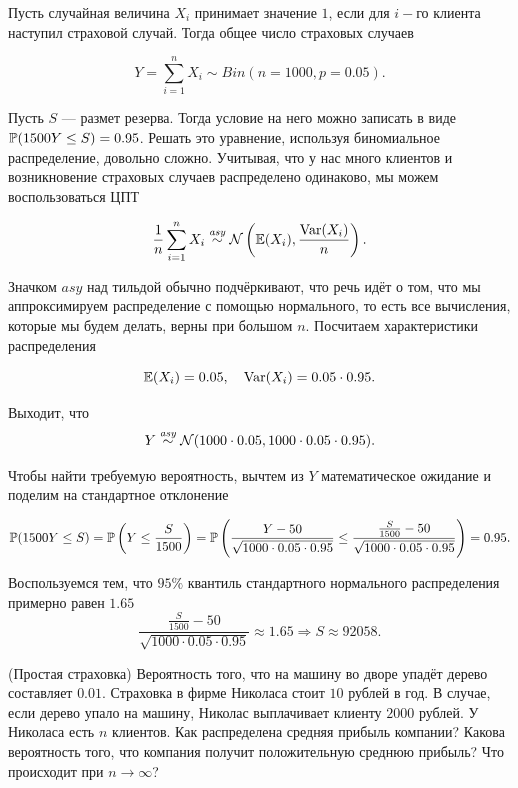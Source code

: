 \documentclass[12pt, a4paper, oneside]{article}
\begin{document}
\begin{sol}
Пусть случайная величина $X_i$ принимает значение $1$, если для $i-$го клиента наступил страховой случай. Тогда общее число страховых случаев 

\[
Y = \sum_{i=1}^n X_i \sim Bin(n=1000, p=0.05).
\]

Пусть $S$ --- размет резерва. Тогда условие на него можно записать в виде $\mathbb{P}(1500 Y \leq S) = 0.95$. Решать это уравнение, используя биномиальное распределение, довольно сложно. Учитывая, что у нас много клиентов и возникновение страховых случаев распределено одинаково, мы можем воспользоваться ЦПТ

\[
\frac{1}{n} \sum_{i=1}^n X_i \overset{\text{\textit{asy}}}{\sim} \mathcal{N} \left(\mathbb{E}(X_i), \frac{\operatorname{Var}(X_i)}{n} \right).
\] 

Значком $asy$ над тильдой обычно подчёркивают, что речь идёт о том, что мы аппроксимируем распределение с помощью нормального, то есть все вычисления, которые мы будем делать, верны при большом $n$. Посчитаем характеристики распределения 

\[
\mathbb{E}(X_i) = 0.05, \quad \operatorname{Var}(X_i) = 0.05 \cdot 0.95.
\]

Выходит, что \[Y \overset{\text{\textit{asy}}}{\sim} \mathcal{N}(1000 \cdot 0.05, 1000 \cdot 0.05 \cdot 0.95).\] 

Чтобы найти требуемую вероятность, вычтем из $Y$ математическое ожидание и поделим на стандартное отклонение

\[
\mathbb{P}(1500 Y \leq S) = \mathbb{P}\left(Y \leq \frac{S}{1500} \right) = \mathbb{P}\left(\frac{Y - 50}{\sqrt{1000 \cdot 0.05 \cdot 0.95}} \leq \frac{\frac{S}{1500}-50}{\sqrt{1000 \cdot 0.05 \cdot 0.95}} \right) = 0.95.
\]

Воспользуемся тем, что $95\%$ квантиль стандартного нормального распределения примерно равен $1.65$
\[
\frac{\frac{S}{1500}-50}{\sqrt{1000 \cdot 0.05 \cdot 0.95}} \approx 1.65 \Rightarrow S \approx 92058.
\]
\end{sol}


\begin{problem}{(Простая страховка)}
Вероятность того, что на машину во дворе упадёт дерево составляет $0.01$. Страховка в фирме Николаса стоит $10$ рублей в год. В случае, если дерево упало на машину, Николас выплачивает клиенту $2000$ рублей. 
У Николаса есть $n$ клиентов. Как распределена средняя прибыль компании? Какова вероятность того, что компания получит положительную среднюю прибыль? Что происходит при $n \to \infty$?
\end{problem}
\end{document}
